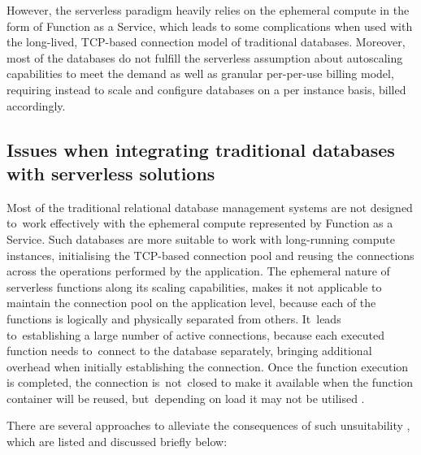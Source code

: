 However, the serverless paradigm heavily relies on the ephemeral compute in the form of Function as a Service, which leads to some complications when used with the long-lived, TCP-based connection model of traditional databases.
Moreover, most of the databases do not fulfill the serverless assumption about autoscaling capabilities to meet the demand as well as granular per-per-use billing model, requiring instead to scale and configure databases on a per instance basis, billed accordingly.

\subsection{Issues when integrating traditional databases with serverless solutions}

Most of the traditional relational database management systems are not designed to~work effectively with the ephemeral compute represented by Function as a Service.
Such databases are more suitable to work with long-running compute instances, initialising the TCP-based connection pool and reusing the connections across the operations performed by the application.
The ephemeral nature of serverless functions along its scaling capabilities, makes it not applicable to maintain the connection pool on the application level, because each of the functions is logically and physically separated from others.
It~leads to~establishing a large number of active connections, because each executed function needs to~connect to the database separately, bringing additional overhead when initially establishing the connection.
Once the function execution is completed, the connection is~not~closed to make it available when the function container will be reused, but~depending on load it may not be utilised \cite{WhyThePIETheoremIsMoreRelevantThanTheCAPTheorem}.

There are several approaches to alleviate the consequences of such unsuitability \cite{BuildingResilientServerlessSystemsWithNonServerlessComponents}, which are listed and discussed briefly below:

